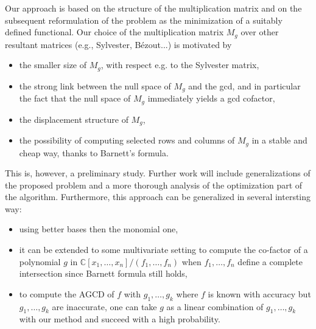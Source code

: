 \documentclass{article}
\newenvironment{itemizedot}{\begin{itemize} \renewcommand{\labelitemi}{$\bullet$}\renewcommand{\labelitemii}{$\bullet$}\renewcommand{\labelitemiii}{$\bullet$}\renewcommand{\labelitemiv}{$\bullet$}}{\end{itemize}}
\begin{document}
Our approach is based on the structure of the multiplication matrix and on
the subsequent reformulation of the problem as the minimization of a suitably
defined functional. Our choice of the multiplication matrix $M_g$ over other
resultant matrices (e.g., Sylvester, B\'ezout...) is motivated by
\begin{itemizedot}
  \item the smaller size of $M_g$, with respect e.g. to the Sylvester matrix,
  
  \item the strong link between the null space of $M_g$ and the gcd, and in
  particular the fact that the null space of $M_g$ immediately yields a gcd
  cofactor,
  
  \item the displacement structure of $M_g$,
  
  \item the possibility of computing selected rows and columns of $M_g$ in a
  stable and cheap way, thanks to Barnett's formula.
\end{itemizedot}
This is, however, a preliminary study. Further work will include
generalizations of the proposed problem and a more thorough analysis of the
optimization part of the algorithm. Furthermore, this approach can be
generalized in several intersting way:
\begin{itemizedot}
  \item using better bases then the monomial one,
  
  \item it can be extended to some multivariate setting to compute the
  co-factor of a polynomial $g$ in $\mathbb{C}[x_1, \ldots, x_n] / (f_1,
  \ldots, f_n)$ when $f_1, \ldots, f_n$ define a complete intersection since
  Barnett formula still holds,
  
  \item to compute the AGCD of $f$ with $g_1, \ldots, g_k$ where $f$ is known
  with accuracy but $g_1, \ldots, g_k$ are inaccurate, one can take $g$ as a
  linear combination of $g_1, \ldots, g_k$ with our method and succeed with a
  high probability.
\end{itemizedot}
\end{document}

